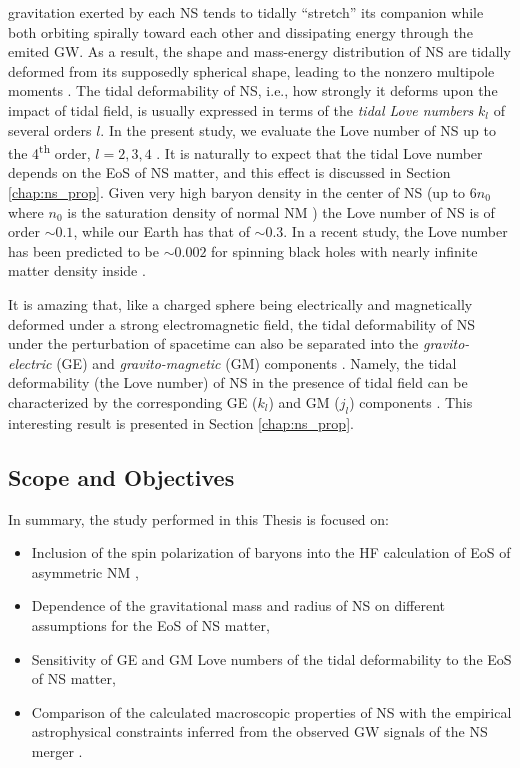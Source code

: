 gravitation exerted by each \gls{NS} tends to tidally ``stretch'' its companion while 
both orbiting spirally toward each other and dissipating energy through the emited 
\gls{GW}. As a result, the shape and mass-energy
distribution of \gls{NS} are tidally deformed from its supposedly spherical shape, 
leading to the nonzero multipole moments 
\citep{hinderer2008tidal,hinderer2010tidal,damour2009relativistic}. The tidal 
deformability of \gls{NS}, i.e., how strongly it deforms upon the impact of tidal field, 
is usually expressed in terms of the \emph{tidal Love numbers} $k_l$ of several orders 
$l$. In the present study, we evaluate the Love number of \gls{NS} 
up to the 4\textsuperscript{th} order, $l=2,3,4$ \citep{perot2021role}. It is naturally
to expect that the tidal Love number depends on the \gls{EoS} of NS matter, and this 
effect is discussed in Section \ref{chap:ns_prop}. Given very high baryon density in the
center of \gls{NS} (up to $6n_0$ where $n_0$ is the saturation density of normal NM ) 
the Love number of NS is of order $\sim 0.1$, while our Earth has that of $\sim 0.3$. 
In a recent study, the Love number has been predicted to be $\sim 0.002$ for spinning 
black holes with nearly infinite matter density inside \citep{le2021spinning}.

It is amazing that, like a charged sphere being electrically and magnetically deformed 
under a strong electromagnetic field, the tidal deformability of NS under the perturbation 
of spacetime can also be separated into the \emph{gravito-electric} (\gls{GE}) 
and \emph{gravito-magnetic} (\gls{GM}) components \citep{damour2009relativistic}. 
Namely, the tidal deformability (the Love number) of \gls{NS}  in the presence of tidal 
field can be characterized by the corresponding \gls{GE} ($k_l$) and \gls{GM} ($j_l$) 
components \citep{perot2021role}. This interesting result is presented in 
Section \ref{chap:ns_prop}.

\subsection*{Scope and Objectives}%
\label{sec:scope_and_objectives}

In summary, the study performed in this Thesis is focused on:
\begin{itemize}
        \item Inclusion of the spin polarization of baryons into the HF calculation
				of EoS of asymmetric NM \citep{tan2021equation},
        \item Dependence of the gravitational mass and radius of \gls{NS} on 
				different assumptions for the \gls{EoS} of NS matter,
        \item Sensitivity of \gls{GE} and \gls{GM} Love numbers of the tidal deformability 
				to the EoS of NS matter,
        \item Comparison of the calculated macroscopic properties of NS with the empirical
				astrophysical constraints inferred from the observed GW signals of the NS merger 
				\citep{abbott2018gw170817,xie2019bayesian}.
\end{itemize}
